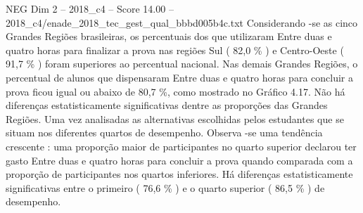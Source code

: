 \begin{textsample}{NEG Dim 2 – 2018\_c4 – Score 14.00 – 2018\_c4/enade\_2018\_tec\_gest\_qual\_bbbd005b4c.txt}
Considerando -se as cinco Grandes Regiões brasileiras, os percentuais dos que utilizaram Entre duas e quatro horas para finalizar a prova nas regiões Sul ( 82,0 \% ) e Centro-Oeste ( 91,7 \% ) foram superiores ao percentual nacional.
Nas demais Grandes Regiões, o percentual de alunos que dispensaram Entre duas e quatro horas para concluir a prova ficou igual ou abaixo de 80,7 \%, como mostrado no Gráfico 4.17.
Não há diferenças estatisticamente significativas dentre as proporções das Grandes Regiões.
Uma vez analisadas as alternativas escolhidas pelos estudantes que se situam nos diferentes quartos de desempenho.
Observa -se uma tendência crescente : uma proporção maior de participantes no quarto superior declarou ter gasto Entre duas e quatro horas para concluir a prova quando comparada com a proporção de participantes nos quartos inferiores.
Há diferenças estatisticamente significativas entre o primeiro ( 76,6 \% ) e o quarto superior ( 86,5 \% ) de desempenho.

\end{textsample}
